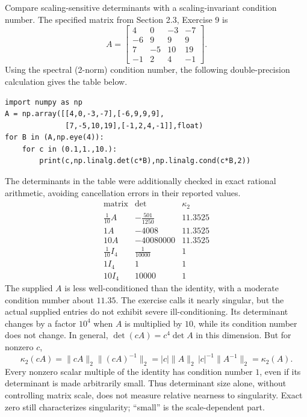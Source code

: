 \goal Compare scaling-sensitive determinants with a scaling-invariant condition number.
The specified matrix from Section 2.3, Exercise 9 is
\[A=\begin{bmatrix}4&0&-3&-7\\-6&9&9&9\\7&-5&10&19\\-1&2&4&-1\end{bmatrix}.\]
Using the spectral (2-norm) condition number, the following double-precision calculation gives the table below.
\begin{verbatim}
import numpy as np
A = np.array([[4,0,-3,-7],[-6,9,9,9],
              [7,-5,10,19],[-1,2,4,-1]],float)
for B in (A,np.eye(4)):
    for c in (0.1,1.,10.):
        print(c,np.linalg.det(c*B),np.linalg.cond(c*B,2))
\end{verbatim}
The determinants in the table were additionally checked in exact rational arithmetic, avoiding cancellation errors in their reported values.
\[\begin{array}{c|rr}\text{matrix}&\det&\kappa_2\\\hline
\frac{1}{10}A&- \frac{501}{1250}&11.3525\\1A&-4008&11.3525\\10A&-40080000&11.3525\\\frac{1}{10}I_4&\frac{1}{10000}&1\\1I_4&1&1\\10I_4&10000&1\end{array}\]
The supplied $A$ is less well-conditioned than the identity, with a moderate condition number about $11.35$. The exercise calls it nearly singular, but the actual supplied entries do not exhibit severe ill-conditioning. Its determinant changes by a factor $10^4$ when $A$ is multiplied by $10$, while its condition number does not change. In general, $\det(cA)=c^4\det A$ in this dimension. But for nonzero $c$,
\[
\kappa_2(cA)=\|cA\|_2\|(cA)^{-1}\|_2
=|c|\|A\|_2\,|c|^{-1}\|A^{-1}\|_2=\kappa_2(A).
\]
Every nonzero scalar multiple of the identity has condition number $1$, even if its determinant is made arbitrarily small. Thus determinant size alone, without controlling matrix scale, does not measure relative nearness to singularity. Exact zero still characterizes singularity; ``small'' is the scale-dependent part.
